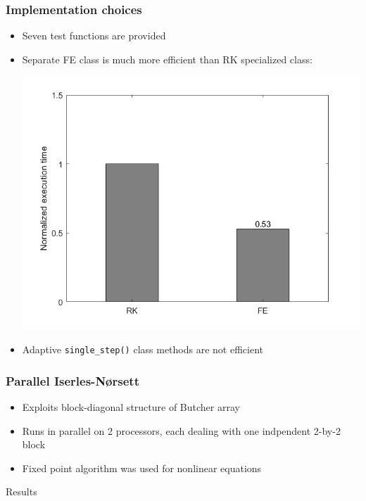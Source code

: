 \documentclass{beamer}
\begin{document}
\begin{frame} %
	\frametitle{Implementation choices}
	\begin{itemize}
		\item Seven test functions are provided
		\item Separate FE class is much more efficient than RK specialized class:
		\begin{center}
			\includegraphics[scale=0.3]{etc/FE_vs_RK.jpeg}
		\end{center}	
		\item Adaptive \texttt{single\_step()} class methods are not efficient
	\end{itemize}
\end{frame}


\begin{frame} %
	\frametitle{Parallel Iserles-Nørsett}
	\begin{itemize}
		\item Exploits block-diagonal structure of Butcher array
		\item Runs in parallel on 2 processors, each dealing with one indpendent 2-by-2 block
		\item Fixed point algorithm was used for nonlinear equations
	\end{itemize}
\end{frame}


\begin{frame}[c] %
\begin{center}
	\Huge \color{blue} Results
\end{center}
\end{frame}
\end{document}
